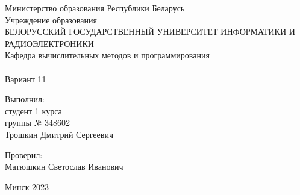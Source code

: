 \begin{titlepage}
	\newpage \null
	\begin{center}
		Министерство образования Республики Беларусь \\[0.4cm] 

			Учреждение образования \\

			\MakeUppercase{БЕЛОРУССКИЙ ГОСУДАРСТВЕННЫЙ УНИВЕРСИТЕТ ИНФОРМАТИКИ И РАДИОЭЛЕКТРОНИКИ} \\[0.4cm]

		Кафедра вычислительных методов и программирования \\ [4cm]

		 \\ 
		Вариант 11 \\ [5cm]
		
		\noindent
		\parbox[t]{0.5\textwidth}{\raggedright
		Выполнил: \\
		студент 1 курса \\
		группы № 348602 \\
		Трошкин Дмитрий Сергеевич}\hfill
		\parbox[t]{0.5\textwidth}{\raggedleft
		Проверил: \\
		Матюшкин Светослав Иванович}%
		\vfill

		{\normalsize Минск 2023}
	\end{center}
\end{titlepage}
